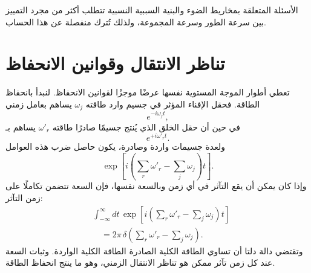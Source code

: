 الأسئلة المتعلقة بمخاريط الضوء والبنية السببية النسبية تتطلب أكثر من مجرد التمييز بين سرعة الطور وسرعة المجموعة، ولذلك تُترك منفصلة عن هذا الحساب.

\section{تناظر الانتقال وقوانين الانحفاظ}

تعطي أطوار الموجة المستوية نفسها عرضًا موجزًا لقوانين الانحفاظ. لنبدأ بانحفاظ الطاقة. فحقل الإفناء المؤثر في جسيم وارد طاقته \(\omega_j\) يساهم بعامل زمني
\begin{equation}
e^{-i\omega_j t},
\end{equation}
في حين أن حقل الخلق الذي يُنتج جسيمًا صادرًا طاقته \(\omega'_r\) يساهم بـ
\begin{equation}
e^{+i\omega'_r t}.
\end{equation}
ولعدة جسيمات واردة وصادرة، يكون حاصل ضرب هذه العوامل
\begin{equation}
\exp\!\left[
i\left(\sum_r\omega'_r-\sum_j\omega_j\right)t
\right].
\end{equation}
وإذا كان يمكن أن يقع التآثر في أي زمن وبالسعة نفسها، فإن السعة تتضمن تكاملًا على زمن التآثر:
\begin{equation}
\begin{aligned}
&\int_{-\infty}^{\infty}dt\,
\exp\!\left[
i\left(\sum_r\omega'_r-\sum_j\omega_j\right)t
\right]
\\
&\quad =2\pi\,
\delta\!\left(\sum_r\omega'_r-\sum_j\omega_j\right).
\end{aligned}
\end{equation}
وتقتضي دالة دلتا أن تساوي الطاقة الكلية الصادرة الطاقة الكلية الواردة. وثبات السعة عند كل زمن تآثر ممكن هو تناظر الانتقال الزمني، وهو ما ينتج انحفاظ الطاقة.

